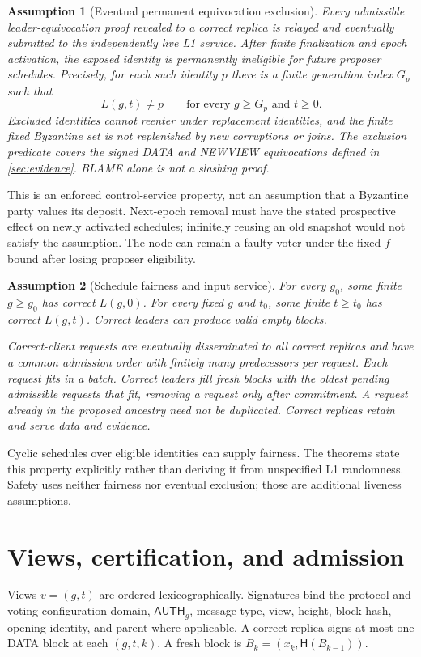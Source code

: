 \documentclass[11pt,a4paper]{article}
\newcommand{\Hash}{\mathsf H}
\newcommand{\tagg}[1]{\mathsf{#1}}
\newtheorem{assumption}[assumption]{Assumption}
\newcounter{protocol}
\begin{document}
\begin{assumption}[Eventual permanent equivocation exclusion]
\label{ass:exclusion}
Every admissible leader-equivocation proof revealed to a correct replica
is relayed and eventually submitted to the independently live L1 service.
After finite finalization and epoch activation, the exposed identity is
permanently ineligible for future proposer schedules. Precisely, for each
such identity $p$ there is a finite generation index $G_p$ such that
\[
 L(g,t)\ne p\qquad\text{for every }g\ge G_p\text{ and }t\ge0.
\]
Excluded identities cannot reenter under replacement identities, and the
finite fixed Byzantine set is not replenished by new corruptions or joins.
The exclusion predicate covers the signed DATA and NEWVIEW equivocations
defined in \cref{sec:evidence}. BLAME alone is not a slashing proof.
\end{assumption}
This is an enforced control-service property, not an assumption that a
Byzantine party values its deposit. Next-epoch removal must have the
stated prospective effect on newly activated schedules; infinitely reusing
an old snapshot would not satisfy the assumption. The node can remain a
faulty voter under the fixed $f$ bound after losing proposer eligibility.

\begin{assumption}[Schedule fairness and input service]
\label{ass:fairness}
For every $g_0$, some finite $g\ge g_0$ has correct $L(g,0)$. For every
fixed $g$ and $t_0$, some finite $t\ge t_0$ has correct $L(g,t)$.
Correct leaders can produce valid empty blocks.

Correct-client requests are eventually disseminated to all correct
replicas and have a common admission order with finitely many predecessors
per request. Each request fits in a batch. Correct leaders fill fresh
blocks with the oldest pending admissible requests that fit, removing a
request only after commitment. A request already in the proposed ancestry
need not be duplicated. Correct replicas retain and serve data and evidence.
\end{assumption}
Cyclic schedules over eligible identities can supply fairness. The
theorems state this property explicitly rather than deriving it from
unspecified L1 randomness. Safety uses neither fairness nor eventual
exclusion; those are additional liveness assumptions.

\section{Views, certification, and admission}
\label{sec:notation}
Views $v=(g,t)$ are ordered lexicographically. Signatures bind the
protocol and voting-configuration domain, $\tagg{AUTH}_g$, message type,
view, height, block hash, opening identity, and parent where applicable.
A correct replica signs at most one DATA block at each $(g,t,k)$.
A fresh block is $B_k=(x_k,\Hash(B_{k-1}))$.
\end{document}
